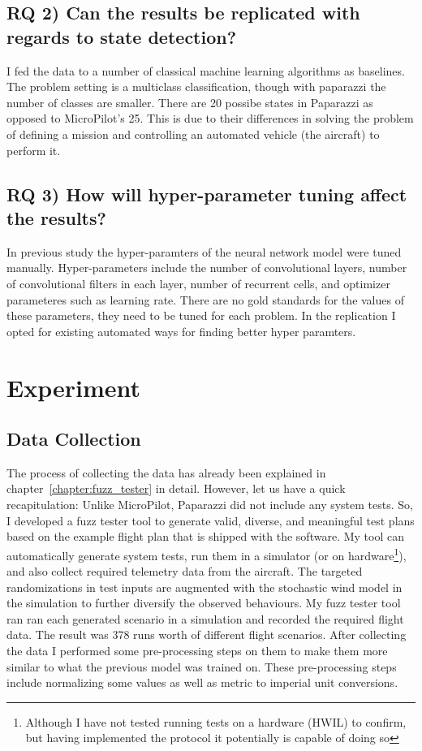 \subsection{RQ 2) Can the results be replicated with regards to state detection?}
I fed the data to a number of classical machine learning algorithms as baselines. The problem setting is a multiclass classification, though with paparazzi the number of classes are smaller. 
There are 20 possibe states in Paparazzi as opposed to MicroPilot's 25. This is due to their differences in solving the problem of defining a mission and controlling an automated vehicle (the aircraft) to perform it.

\subsection{RQ 3) How will hyper-parameter tuning affect the results?}
In previous study the hyper-paramters of the neural network model were tuned manually. Hyper-parameters include the number of convolutional layers, number of convolutional filters in each layer, number of recurrent cells, and optimizer parameteres such as learning rate. There are no gold standards for the values of these parameters, they need to be tuned for each problem. In the replication I opted for existing automated ways for finding better hyper paramters.


\section{Experiment}
\subsection{Data Collection}
The process of collecting the data has already been explained in chapter~\ref{chapter:fuzz_tester} in detail. However, let us have a quick recapitulation:
Unlike MicroPilot, Paparazzi did not include any system tests. So, I developed a fuzz tester tool to generate valid, diverse, and meaningful test plans based on the example flight plan that is shipped with the software. My tool can automatically generate system tests, run them in a simulator (or on hardware\footnote{Although I have not tested running tests on a hardware (HWIL) to confirm, but having implemented the protocol it potentially is capable of doing so}), and also collect required telemetry data from the aircraft. The targeted randomizations in test inputs are augmented with the stochastic wind model in the simulation to further diversify the observed behaviours. My fuzz tester tool ran ran each generated scenario in a simulation and recorded the required flight data.
The result was 378 runs worth of different flight scenarios.
After collecting the data I performed some pre-processing steps on them to make them more similar to what the previous model was trained on. These pre-processing steps include normalizing some values as well as metric to imperial unit conversions.


